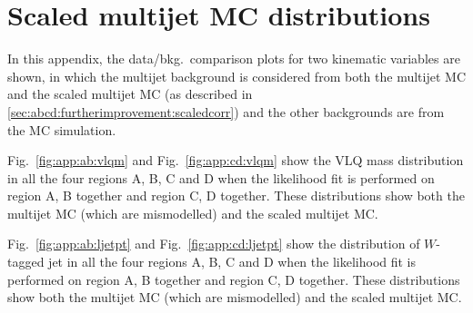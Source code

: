\chapter{Scaled multijet MC distributions}
\label{sec:app2}
In this appendix, the data/bkg.\ comparison plots for two kinematic variables are shown, in which the multijet background is considered from both the multijet MC and the scaled multijet MC (as described in \ref{sec:abcd:furtherimprovement:scaledcorr}) and the other backgrounds are from the MC simulation.

Fig.\ \ref{fig:app:ab:vlqm} and Fig.\ \ref{fig:app:cd:vlqm} show the VLQ mass distribution in all the four regions A, B, C and D when the likelihood fit is performed on region A, B together and region C, D together. These distributions show both the multijet MC (which are mismodelled) and the scaled multijet MC.

Fig.\ \ref{fig:app:ab:ljetpt} and Fig.\ \ref{fig:app:cd:ljetpt} show the \pt distribution of $W$-tagged jet in all the four regions A, B, C and D when the likelihood fit is performed on region A, B together and region C, D together. These distributions show both the multijet MC (which are mismodelled) and the scaled multijet MC.

